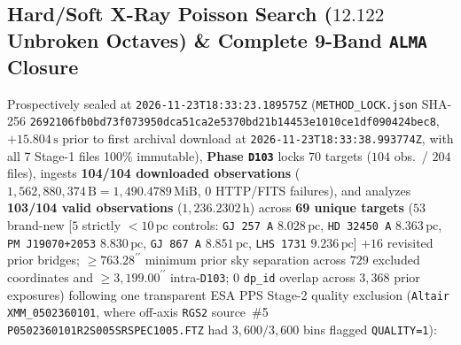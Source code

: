 \documentclass[twocolumn,10pt]{article}
\begin{document}
\subsection{Hard/Soft X-Ray Poisson Search ($12.122$ Unbroken Octaves) \& Complete 9-Band \texttt{ALMA} Closure}
Prospectively sealed at \texttt{2026-11-23T18:33:23.189575Z} (\texttt{METHOD\_LOCK.json} SHA-256 \texttt{2692106f\allowbreak b0bd73f0\allowbreak 73950dca\allowbreak 51ca2e53\allowbreak 70bd21b1\allowbreak 4453e101\allowbreak 0ce1df09\allowbreak 0424bec8}, $+15.804\,\text{s}$ prior to first archival download at \texttt{2026-11-23T18:33:38.993774Z}, with all 7 Stage-1 files 100\% immutable), \textbf{Phase \texttt{D103}} locks $70$ targets ($104$ obs.\ / $204$ files), ingests \textbf{104/104 downloaded observations} ($1{,}562{,}880{,}374\,\text{B} = 1{,}490.4789\,\text{MiB}$, $0$ HTTP/FITS failures), and analyzes \textbf{103/104 valid observations} ($1{,}236.2302\,\text{h}$) across \textbf{69 unique targets} ($53$ brand-new [$5$ strictly $<10\,\text{pc}$ controls: \texttt{GJ\,257\,A} $8.028\,\text{pc}$, \texttt{HD\,32450\,A} $8.363\,\text{pc}$, \texttt{PM\,J19070+2053} $8.830\,\text{pc}$, \texttt{GJ\,867\,A} $8.851\,\text{pc}$, \texttt{LHS\,1731} $9.236\,\text{pc}$] $+ 16$ revisited prior bridges; $\ge 763.28^{\prime\prime}$ minimum prior sky separation across $729$ excluded coordinates and $\ge 3{,}199.00^{\prime\prime}$ intra-\texttt{D103}; $0$ \texttt{dp\_id} overlap across $3{,}368$ prior exposures) following one transparent ESA PPS Stage-2 quality exclusion (\texttt{Altair} \texttt{XMM\_0502360101}, where off-axis \texttt{RGS2} source~\#5 \texttt{P0502360101R2S005SRSPEC1005.FTZ} had $3{,}600/3{,}600$ bins flagged \texttt{QUALITY=1}):
\end{document}
